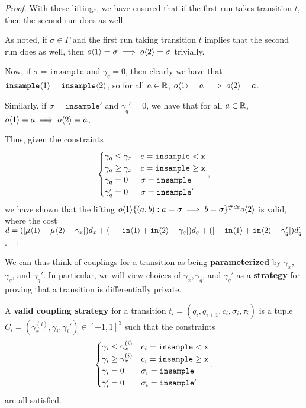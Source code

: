 \begin{proof}
With these liftings, we have ensured that if the first run takes transition $t$, then the second run does as well. 

As noted, if $\sigma \in \Gamma$ and the first run taking transition $t$ implies that the second run does as well, then $o\brangle{1} = \sigma \implies o\brangle{2}=\sigma$ trivially.

Now, if $\sigma=\texttt{insample}$ and $\gamma_q=0$, then clearly we have that $\texttt{insample}\brangle{1}=\texttt{insample}\brangle{2}$, so for all $a\in \RR$, $o\brangle{1} = a\implies o\brangle{2} = a$.

Similarly, if $\sigma=\texttt{insample}'$ and $\gamma_q'=0$, we have that for all $a\in \RR$, $o\brangle{1} = a\implies o\brangle{2} = a$.

Thus, given the constraints \[
  \begin{cases}
    \gamma_q\leq\gamma_x & c = \lguard[\texttt{x}]\\
    \gamma_q\geq\gamma_x & c = \gguard[\texttt{x}]\\
    \gamma_q=0 & \sigma = \texttt{insample}\\
    \gamma_q'=0 & \sigma = \texttt{insample}'
  \end{cases},
\]
we have shown that the lifting $o\brangle{1}\{(a, b): a=\sigma\implies b=\sigma\}^{\#d\varepsilon}o\brangle{2}$ is valid, where the cost $d = (|\mu\brangle{1}-\mu\brangle{2}+\gamma_x|)d_x+(|-\texttt{in}\brangle{1}+\texttt{in}\brangle{2}-\gamma_q|)d_q+(|-\texttt{in}\brangle{1}+\texttt{in}\brangle{2}-\gamma_q'|)d_q'$. 

\end{proof}

We can thus think of couplings for a transition as being \textbf{parameterized} by $\gamma_x$, $\gamma_q$, and $\gamma_q'$. In particular, we will view choices of $\gamma_x, \gamma_q$, and $\gamma_q'$ as a \textbf{strategy} for proving that a transition is differentially private. 


\begin{defn}
    A \textbf{valid coupling strategy} for a transition $t_i = (q_i, q_{i+1}, c_i, \sigma_i, \tau_i)$ is a tuple $C_i = (\gamma_x^{(i)}, \gamma_i, \gamma_i')\in [-1, 1]^3$ such that the constraints \[
        \begin{cases}
          \gamma_i\leq\gamma_x^{(i)} & c_i = \lguard[\texttt{x}]\\
          \gamma_i\geq\gamma_x^{(i)} & c_i = \gguard[\texttt{x}]\\
          \gamma_i=0 & \sigma_i = \texttt{insample}\\
          \gamma_i'=0 & \sigma_i = \texttt{insample}'
        \end{cases},
      \]
      are all satisfied. 
\end{defn}